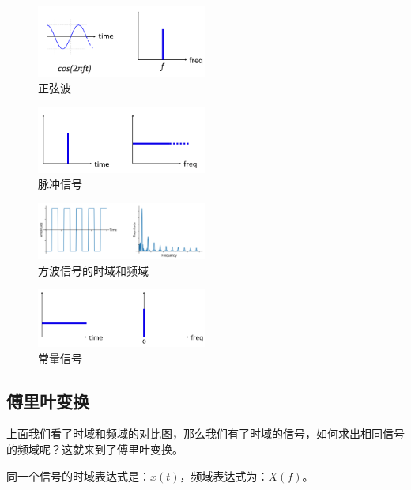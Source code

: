 \documentclass[lang=cn,newtx,10pt,scheme=chinese]{elegantbook}
\begin{document}
\begin{figure}[!htb]
\centering
\includegraphics[width=0.5\textwidth]{sine-wave.png}
\caption{正弦波}
\label{fig:sine-wave}
\end{figure}

\begin{figure}[!htb]
\centering
\includegraphics[width=0.5\textwidth]{impulse.png}
\caption{脉冲信号}
\label{fig:impulse}
\end{figure}

\begin{figure}[!htb]
\centering
\includegraphics[width=0.5\textwidth]{square-wave.pdf}
\caption{方波信号的时域和频域}
\label{fig:square-wave}
\end{figure}

\begin{figure}[!htb]
\centering
\includegraphics[width=0.5\textwidth]{dc-signal.png}
\caption{常量信号}
\label{fig:dc-signal}
\end{figure}

\subsection{傅里叶变换}

上面我们看了时域和频域的对比图，那么我们有了时域的信号，如何求出相同信号的频域呢？这就来到了傅里叶变换。

同一个信号的时域表达式是：$x(t)$，频域表达式为：$X(f)$。
\end{document}
